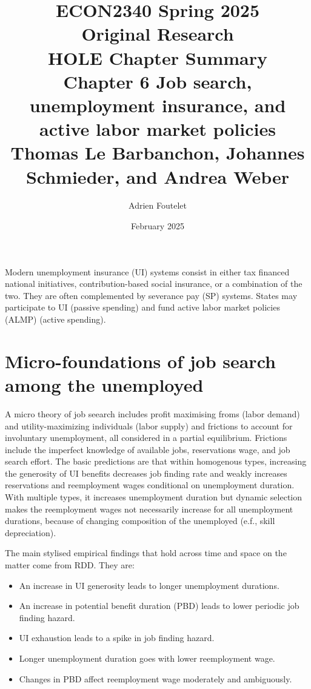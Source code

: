 \documentclass{article}
\title{ECON2340 Spring 2025\\Original Research\\HOLE Chapter Summary\\Chapter 6 Job search, unemployment insurance, and active labor market policies\\Thomas Le Barbanchon, Johannes Schmieder, and Andrea Weber}
\author{Adrien Foutelet}
\date{February 2025}
\begin{document}
\maketitle







Modern unemployment insurance (UI) systems consist in either tax financed national initiatives, contribution-based social insurance, or a combination of the two. They are often complemented by severance pay (SP) systems. States may participate to UI (passive spending) and fund active labor market policies (ALMP) (active spending).

\section{Micro-foundations of job search among the unemployed}

A micro theory of job seearch includes profit maximising froms (labor demand) and utility-maximizing individuals (labor supply) and frictions to account for involuntary unemployment, all considered in a partial equilibrium. Frictions include the imperfect knowledge of available jobs, reservations wage, and job search effort. The basic predictions are that within homogenous types, increasing the generosity of UI benefits decreases job finding rate and weakly increases reservations and reemployment wages conditional on unemployment duration. With multiple types, it increases unemployment duration but dynamic selection makes the reemployment wages not necessarily increase for all unemployment durations, because of changing composition of the unemployed (e.f., skill depreciation).

The main stylised empirical findings that hold across time and space on the matter come from RDD. They are:
\begin{itemize}
    \item An increase in UI generosity leads to longer unemployment durations.
    \item An increase in potential benefit duration (PBD) leads to lower periodic job finding hazard.
    \item UI exhaustion leads to a spike in job finding hazard.
    \item Longer unemployment duration goes with lower reemployment wage.
    \item Changes in PBD affect reemployment wage moderately and ambiguously.
\end{itemize}
 
\end{document}
